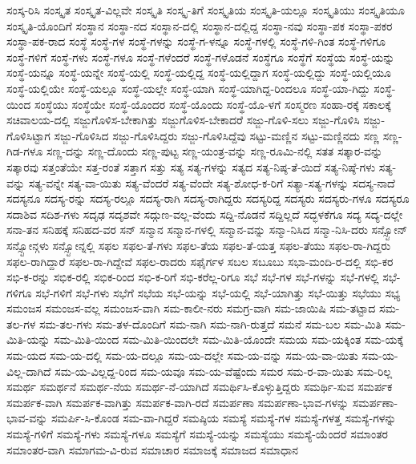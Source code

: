 {ಸಂಸ್ಕ-ರಿಸಿ
ಸಂಸ್ಕೃತ
ಸಂಸ್ಕೃತ-ವಿಲ್ಲವೇ
ಸಂಸ್ಕೃತಿ
ಸಂಸ್ಕೃ-ತಿಗೆ
ಸಂಸ್ಕೃತಿಯ
ಸಂಸ್ಕೃತಿ-ಯಲ್ಲೂ
ಸಂಸ್ಕೃತಿಯು
ಸಂಸ್ಕೃತಿಯೂ
ಸಂಸ್ಕೃತಿ-ಯೊಂದಿಗೆ
ಸಂಸ್ಥಾನ
ಸಂಸ್ಥಾ-ನದ
ಸಂಸ್ಥಾನ-ದಲ್ಲಿ
ಸಂಸ್ಥಾನ-ದಲ್ಲಿದ್ದ
ಸಂಸ್ಥಾ-ನವು
ಸಂಸ್ಥಾ-ಪಕ
ಸಂಸ್ಥಾ-ಪಕರ
ಸಂಸ್ಥಾ-ಪಕ-ರಾದ
ಸಂಸ್ಥೆ
ಸಂಸ್ಥೆ-ಗಳ
ಸಂಸ್ಥೆ-ಗಳನ್ನು
ಸಂಸ್ಥೆ-ಗ-ಳನ್ನೂ
ಸಂಸ್ಥೆ-ಗಳಲ್ಲಿ
ಸಂಸ್ಥೆ-ಗಳಿ-ಗಿಂತ
ಸಂಸ್ಥೆ-ಗಳಿಗೂ
ಸಂಸ್ಥೆ-ಗಳಿಗೆ
ಸಂಸ್ಥೆ-ಗಳು
ಸಂಸ್ಥೆ-ಗಳೂ
ಸಂಸ್ಥೆ-ಗಳೆಂದರೆ
ಸಂಸ್ಥೆ-ಗಳೊಡನೆ
ಸಂಸ್ಥೆಗೂ
ಸಂಸ್ಥೆಗೆ
ಸಂಸ್ಥೆಯ
ಸಂಸ್ಥೆ-ಯನ್ನು
ಸಂಸ್ಥೆ-ಯನ್ನೂ
ಸಂಸ್ಥೆ-ಯನ್ನೇ
ಸಂಸ್ಥೆ-ಯಲ್ಲಿ
ಸಂಸ್ಥೆ-ಯಲ್ಲಿದ್ದ
ಸಂಸ್ಥೆ-ಯಲ್ಲಿದ್ದಾಗ
ಸಂಸ್ಥೆ-ಯಲ್ಲಿದ್ದು
ಸಂಸ್ಥೆ-ಯಲ್ಲಿಯೂ
ಸಂಸ್ಥೆ-ಯಲ್ಲಿಯೇ
ಸಂಸ್ಥೆ-ಯಲ್ಲೂ
ಸಂಸ್ಥೆ-ಯಲ್ಲೇ
ಸಂಸ್ಥೆ-ಯಾಗಿ
ಸಂಸ್ಥೆ-ಯಾಗಿದ್ದ-ರಿಂದಲೂ
ಸಂಸ್ಥೆ-ಯಾ-ಗಿದ್ದು
ಸಂಸ್ಥೆ-ಯಿಂದ
ಸಂಸ್ಥೆಯು
ಸಂಸ್ಥೆಯೇ
ಸಂಸ್ಥೆ-ಯೊಂದರ
ಸಂಸ್ಥೆ-ಯೊಂದು
ಸಂಸ್ಥೆ-ಯೊ-ಳಗೆ
ಸಂಸ್ಮರಣ
ಸಂಹಾ-ರಕ್ಕೆ
ಸಕಾಲಕ್ಕೆ
ಸಚಿವಾಲಯ-ದಲ್ಲಿ
ಸಜ್ಜುಗೊಳಿಸ-ಬೇಕಾಗಿತ್ತು
ಸಜ್ಜುಗೊಳಿಸ-ಬೇಕಾದರೆ
ಸಜ್ಜು-ಗೊಳಿ-ಸಲು
ಸಜ್ಜು-ಗೊಳಿಸಿ
ಸಜ್ಜು-ಗೊಳಿಸಿಟ್ಟಾಗ
ಸಜ್ಜು-ಗೊಳಿಸಿದ
ಸಜ್ಜು-ಗೊಳಿಸಿದ್ದರು
ಸಜ್ಜು-ಗೊಳಿಸಿದ್ದೆವು
ಸಟ್ಟು-ಮಣ್ಣಿನ
ಸಟ್ಟು-ಮಣ್ಣಿನದು
ಸಣ್ಣ
ಸಣ್ಣ-ಗಿಡ-ಗಳೂ
ಸಣ್ಣ-ದನ್ನು
ಸಣ್ಣ-ದೊಂದು
ಸಣ್ಣ-ಪುಟ್ಟ
ಸಣ್ಣ-ಯಂತ್ರ-ವನ್ನು
ಸಣ್ಣ-ರೂಮಿ-ನಲ್ಲಿ
ಸತತ
ಸತ್ಕಾರ-ವನ್ನು
ಸತ್ಕಾರವು
ಸತ್ತಂತೆಯೇ
ಸತ್ತ-ರಂತೆ
ಸತ್ತಾಗ
ಸತ್ತು
ಸತ್ಯ
ಸತ್ಯ-ಗಳನ್ನು
ಸತ್ಯದ
ಸತ್ಯ-ನಿಷ್ಠ-ತೆ-ಯಿದೆ
ಸತ್ಯ-ನಿಷ್ಠೆ-ಗಳು
ಸತ್ಯ-ವನ್ನು
ಸತ್ಯ-ವನ್ನೇ
ಸತ್ಯ-ವಾ-ಯಿತು
ಸತ್ಯ-ವೆಂದರೆ
ಸತ್ಯ-ವೆಂದೇ
ಸತ್ಯ-ಶೋಧ-ಕ-ರಿಗೆ
ಸತ್ಯಾ-ಸತ್ಯ-ಗಳನ್ನು
ಸದಸ್ಯ-ನಾದೆ
ಸದಸ್ಯನೂ
ಸದಸ್ಯ-ರನ್ನು
ಸದಸ್ಯ-ರಲ್ಲೂ
ಸದಸ್ಯ-ರಾಗಿ
ಸದಸ್ಯ-ರಾಗಿದ್ದರು
ಸದಸ್ಯರಿದ್ದ
ಸದಸ್ಯರು
ಸದಸ್ಯರು-ಗಳೂ
ಸದಸ್ಯರೂ
ಸದಾಶಿವ
ಸದಿಶ-ಗಳು
ಸದೃಢ
ಸದೃಶವೇ
ಸದ್ಗುಣ-ವಲ್ಲ-ವೆಂದು
ಸದ್ದಿ-ನೊಡನೆ
ಸದ್ದಿಲ್ಲದೆ
ಸದ್ಭಳಕೆಗೂ
ಸದ್ಯ
ಸದ್ಯ-ದಲ್ಲೇ
ಸನಾ-ತನ
ಸನಿಹಕ್ಕೆ
ಸನಿಹದ-ವರ
ಸನ್
ಸನ್ಮಾನ
ಸನ್ಮಾನ-ಗಳಲ್ಲಿ
ಸನ್ಮಾನ-ವನ್ನು
ಸನ್ಮಾ-ನಿಸಿದ
ಸನ್ಮಾ-ನಿಸಿ-ದರು
ಸನ್ಸ್ಟೋನ್
ಸನ್ಸ್ಟೋನ್ಗಳು
ಸನ್ಸ್ಟೋನ್ನಲ್ಲಿ
ಸಫಲ
ಸಫಲ-ತೆ-ಗಳು
ಸಫಲ-ತೆಯ
ಸಫಲ-ತೆ-ಯತ್ತ
ಸಫಲ-ತೆಯು
ಸಫಲ-ರಾ-ಗಿದ್ದರು
ಸಫಲ-ರಾಗಿದ್ದಾರೆ
ಸಫಲ-ರಾ-ಗಿದ್ದೇವೆ
ಸಫಲ-ರಾದರು
ಸಫೈರ್ಗಳ
ಸಬಲ
ಸಬೂಬು
ಸಭಾ-ಮಂದಿ-ರ-ದಲ್ಲಿ
ಸಭಿ-ಕರ
ಸಭಿ-ಕ-ರನ್ನು
ಸಭಿಕ-ರಲ್ಲಿ
ಸಭಿಕ-ರಿಂದ
ಸಭಿ-ಕ-ರಿಗೆ
ಸಭಿ-ಕರೆಲ್ಲ-ರಿಗೂ
ಸಭೆ
ಸಭೆ-ಗಳ
ಸಭೆ-ಗಳನ್ನು
ಸಭೆ-ಗಳಲ್ಲಿ
ಸಭೆ-ಗಳಿಗೂ
ಸಭೆ-ಗಳಿಗೆ
ಸಭೆ-ಗಳು
ಸಭೆಗೆ
ಸಭೆಯ
ಸಭೆ-ಯನ್ನು
ಸಭೆ-ಯಲ್ಲಿ
ಸಭೆ-ಯಾಗಿತ್ತು
ಸಭೆ-ಯಿತ್ತು
ಸಭೆಯು
ಸಭ್ಯ
ಸಮಂಜಸ
ಸಮಂಜಸ-ವಲ್ಲ
ಸಮಂಜಸ-ವಾಗಿ
ಸಮ-ಕಾಲೀ-ನರು
ಸಮಗ್ರ-ವಾಗಿ
ಸಮ-ಜಾಯಿಷಿ
ಸಮ-ತಟ್ಟಾದ
ಸಮ-ತಲ-ಗಳ
ಸಮ-ತಲ-ಗಳು
ಸಮ-ತಳ-ದೊಂದಿಗೆ
ಸಮ-ನಾಗಿ
ಸಮ-ನಾಗಿ-ರುತ್ತದೆ
ಸಮನೆ
ಸಮ-ಬಲ
ಸಮ-ಮಿತಿ
ಸಮ-ಮಿತಿ-ಯನ್ನು
ಸಮ-ಮಿತಿ-ಯಿಂದ
ಸಮ-ಮಿತಿ-ಯಿಂದಲೇ
ಸಮ-ಮಿತಿ-ಯೊಂದೇ
ಸಮಯ
ಸಮ-ಯಕ್ಕಿಂತ
ಸಮ-ಯಕ್ಕೆ
ಸಮ-ಯದ
ಸಮ-ಯ-ದಲ್ಲಿ
ಸಮ-ಯ-ದಲ್ಲೂ
ಸಮ-ಯ-ದಲ್ಲೇ
ಸಮ-ಯ-ವನ್ನು
ಸಮ-ಯ-ವಾ-ಯಿತು
ಸಮ-ಯ-ವಿಲ್ಲ-ದಾಗಿದೆ
ಸಮ-ಯ-ವಿಲ್ಲದ್ದ-ರಿಂದ
ಸಮ-ಯವೂ
ಸಮ-ಯ-ವೆಷ್ಟೆಂದು
ಸಮರ
ಸಮ-ರ-ವಾ-ಯಿತು
ಸಮ-ರಿಲ್ಲ
ಸಮರ್ಥ
ಸಮರ್ಥನೆ
ಸಮರ್ಥ-ನೆಯ
ಸಮರ್ಥ-ನೆ-ಯಾಗಿದೆ
ಸಮರ್ಥಿಸಿ-ಕೊಳ್ಳುತ್ತಿದ್ದರು
ಸಮರ್ಥಿ-ಸುವ
ಸಮರ್ಪಕ
ಸಮರ್ಪಕ-ವಾಗಿ
ಸಮರ್ಪಕ-ವಾಗಿತ್ತು
ಸಮರ್ಪಕ-ವಾಗಿ-ರದೆ
ಸಮರ್ಪಣಾ
ಸಮರ್ಪಣಾ-ಭಾವ-ಗಳನ್ನು
ಸಮರ್ಪಣಾ-ಭಾವ-ವನ್ನು
ಸಮರ್ಪಿ-ಸಿ-ಕೊಂಡ
ಸಮ-ವಾ-ಗಿದ್ದರೆ
ಸಮಷ್ಠಿಯ
ಸಮಸ್ಯೆ
ಸಮಸ್ಯೆ-ಗಳ
ಸಮಸ್ಯೆ-ಗಳತ್ತ
ಸಮಸ್ಯೆ-ಗಳನ್ನು
ಸಮಸ್ಯೆ-ಗಳಿಗೆ
ಸಮಸ್ಯೆ-ಗಳು
ಸಮಸ್ಯೆ-ಗಳೂ
ಸಮಸ್ಯೆಗೆ
ಸಮಸ್ಯೆ-ಯನ್ನು
ಸಮಸ್ಯೆಯು
ಸಮಸ್ಯೆ-ಯೆಂದರೆ
ಸಮಾಂತರ
ಸಮಾಂತರ-ವಾಗಿ
ಸಮಾಗಮ-ವಿ-ರುವ
ಸಮಾಚಾರ
ಸಮಾಜಕ್ಕೆ
ಸಮಾಜದ
ಸಮಾಧಾನ
}

